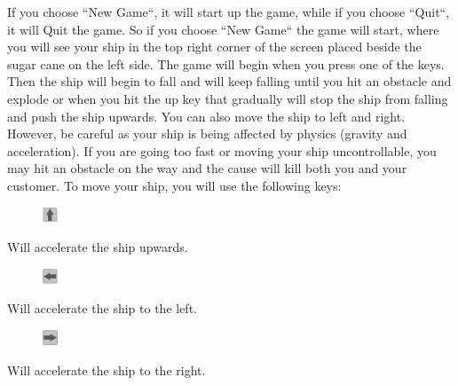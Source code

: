 \documentclass[../master.tex]{subfile}
\begin{document}
If you choose ``New Game``, it will start up the game, while if you choose ``Quit``, it will Quit the game. So if you choose ``New Game`` the game will start, where you will see your ship in the top right corner of the screen placed beside the sugar cane on the left side. The game will begin when you press one of the keys. Then the ship will begin to fall and will keep falling until you hit an obstacle and explode or when you hit the up key that gradually will stop the ship from falling and push the ship upwards. You can also move the ship to left and right. However, be careful as your ship is being affected by physics (gravity and acceleration). If you are going too fast or moving your ship uncontrollable, you may hit an obstacle on the way and the cause will kill both you and your customer. To move your ship, you will use the following keys:\\
\begin{figure}
	\vspace{-6.9mm}
	\begin{centering}
		\includegraphics[width=0.04\textwidth]{./Pictures/Pil_op.png}
	\end{centering}
	\vspace{-6mm}
\end{figure}
Will accelerate the ship upwards.\\

\begin{figure}
	\vspace{-6.9mm}
	\begin{centering}
		\includegraphics[width=0.04\textwidth]{./Pictures/Pil_venstre.png}
	\end{centering}
	\vspace{-6mm}
\end{figure}
Will accelerate the ship to the left.\\

\begin{figure}
	\vspace{-6.9mm}
	\begin{centering}
		\includegraphics[width=0.04\textwidth]{./Pictures/Pil_right.png}
	\end{centering}
	\vspace{-6mm}
\end{figure}
Will accelerate the ship to the right.\\
\end{document}
